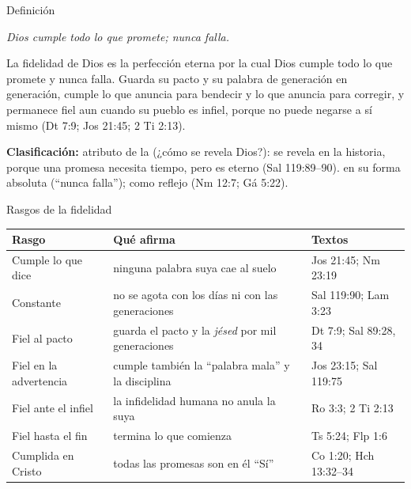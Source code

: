 \begin{frame}{Definición}
\begin{tcolorbox}[colback=papiro,colframe=dorado,boxrule=1.2pt,arc=3pt]
\centering\itshape Dios cumple todo lo que promete; nunca falla.
\end{tcolorbox}
\begin{tcolorbox}[colback=papiro,colframe=azul,boxrule=1pt,arc=3pt]
\small La fidelidad de Dios es la perfección eterna por la cual Dios cumple todo lo que promete y nunca falla. Guarda su pacto y su palabra de generación en generación, cumple lo que anuncia para bendecir y lo que anuncia para corregir, y permanece fiel aun cuando su pueblo es infiel, porque no puede negarse a sí mismo (Dt 7:9; Jos 21:45; 2 Ti 2:13).
\end{tcolorbox}
\scriptsize\textbf{Clasificación:} atributo de la  (¿cómo se revela Dios?): se revela en la historia, porque una promesa necesita tiempo, pero es eterno (Sal 119:89--90).  en su forma absoluta (``nunca falla'');  como reflejo (Nm 12:7; Gá 5:22).\par
{}
\end{frame}

\begin{frame}{Rasgos de la fidelidad}
\scriptsize\renewcommand{\arraystretch}{1.18}
\begin{tabular}{@{}>{\RaggedRight\arraybackslash}p{3.0cm}>{\RaggedRight\arraybackslash}p{5.6cm}>{\RaggedRight\arraybackslash}p{3.4cm}@{}}
\toprule
\textbf{Rasgo} & \textbf{Qué afirma} & \textbf{Textos} \\ \midrule
Cumple lo que dice & ninguna palabra suya cae al suelo & Jos 21:45; Nm 23:19 \\
Constante & no se agota con los días ni con las generaciones & Sal 119:90; Lam 3:23 \\
Fiel al pacto & guarda el pacto y la \emph{jésed} por mil generaciones & Dt 7:9; Sal 89:28, 34 \\
Fiel en la advertencia & cumple también la ``palabra mala'' y la disciplina & Jos 23:15; Sal 119:75 \\
Fiel ante el infiel & la infidelidad humana no anula la suya & Ro 3:3; 2 Ti 2:13 \\
Fiel hasta el fin & termina lo que comienza & 1 Ts 5:24; Flp 1:6 \\
Cumplida en Cristo & todas las promesas son en él ``Sí'' & 2 Co 1:20; Hch 13:32--34 \\
\bottomrule
\end{tabular}
\end{frame}

